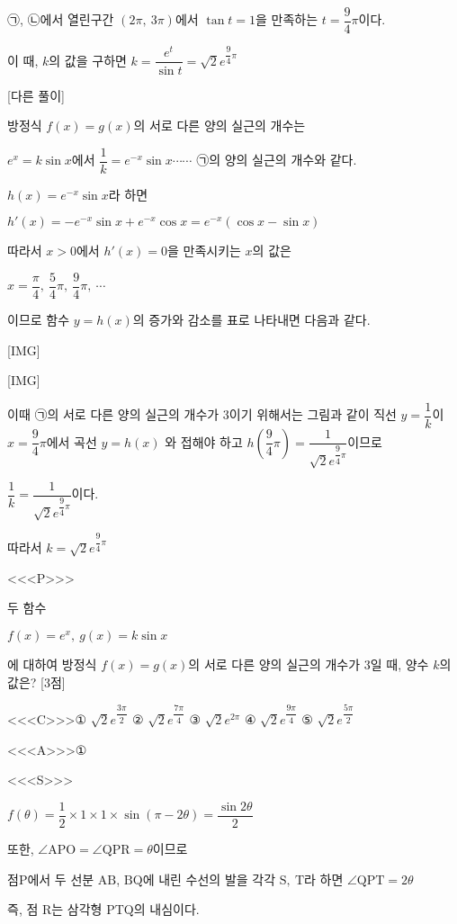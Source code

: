 \documentclass{oblivoir}
\begin{document}
㉠, ㉡에서 열린구간 $(2\pi ,\: 3\pi)$에서 $\tan t=1$을 만족하는 $t =\dfrac{9}{4}\pi$이다.

이 때, $k$의 값을 구하면 $k=\dfrac{e^{t}}{\sin t}=\sqrt{2}e^{\dfrac{9}{4}\pi}$

[다른 풀이]

방정식 $f(x)=g(x)$의 서로 다른 양의 실근의 개수는

$e^{x}= k\sin x$에서 $\dfrac{1}{k}=e^{-x}\sin x$$\cdots\cdots$ ㉠의 양의 실근의 개수와 같다.  

$h(x)=e^{-x}\sin x$라 하면

$h'(x)=-e^{-x}\sin x +e^{-x}\cos x =e^{-x}(\cos x -\sin x)$

따라서 $x>0$에서 $h'(x)=0$을 만족시키는 $x$의 값은

$x=\dfrac{\pi}{4},\:\dfrac{5}{4}\pi ,\:\dfrac{9}{4}\pi ,\:\cdots$

이므로 함수 $y=h(x)$의 증가와 감소를 표로 나타내면 다음과 같다.

[IMG]

[IMG]

이때 ㉠의 서로 다른 양의 실근의 개수가 $3$이기 위해서는 그림과 같이 직선 $y=\dfrac{1}{k}$이 $x=\dfrac{9}{4}\pi$에서 곡선 $y=h(x)$ 와 접해야 하고 $h\left(\dfrac{9}{4}\pi\right)=\dfrac{1}{\sqrt{2}e^{\dfrac{9}{4}\pi}}$이므로

$\dfrac{1}{k}=\dfrac{1}{\sqrt{2}e^{\dfrac{9}{4}\pi}}$이다.

따라서 $k=\sqrt{2}e^{\dfrac{9}{4}\pi}$

<<<P>>>

두 함수

$f(x)=e^{x},\:g(x)=k\sin x$

에 대하여 방정식 $f(x)=g(x)$의 서로 다른 양의 실근의 개수가 $3$일 때, 양수 $k$의 값은? [3점]

<<<C>>>① $\sqrt{2}e^{\dfrac{3\pi}{2}}$ ② $\sqrt{2}e^{\dfrac{7\pi}{4}}$ ③ $\sqrt{2}e^{2\pi}$ ④ $\sqrt{2}e^{\dfrac{9\pi}{4}}$ ⑤ $\sqrt{2}e^{\dfrac{5\pi}{2}}$

<<<A>>>①

<<<S>>>

$f(\theta)=\dfrac{1}{2}\times 1\times 1\times\sin(\pi -2\theta)=\dfrac{\sin 2\theta}{2}$

또한, $\angle\mathrm{APO}=\angle\mathrm{QPR}=\theta$이므로

점$\mathrm{P}$에서 두 선분 $\mathrm{AB}$, $\mathrm{BQ}$에 내린 수선의 발을 각각 $\mathrm{S},\:\mathrm{T}$라 하면 $\angle\mathrm{QPT}=2\theta$

즉, 점 $\mathrm{R}$는 삼각형 $\mathrm{PTQ}$의 내심이다.
\end{document}

